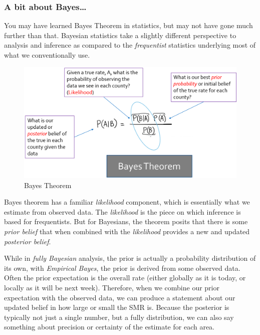 \documentclass[
]{book}
\begin{document}
\hypertarget{a-bit-about-bayes}{%
\subsubsection{A bit about Bayes\ldots{}}\label{a-bit-about-bayes}}

You may have learned Bayes Theorem in statistics, but may not have gone much further than that. Bayesian statistics take a slightly different perspective to analysis and inference as compared to the \emph{frequentist} statistics underlying most of what we conventionally use.

\begin{figure}
\centering
\includegraphics{images/bayes.png}
\caption{\label{fig:unnamed-chunk-21}Bayes Theorem}
\end{figure}

Bayes theorem has a familiar \emph{likelihood} component, which is essentially what we estimate from observed data. The \emph{likelihood} is the piece on which inference is based for frequentists. But for Bayesians, the theorem posits that there is some \emph{prior belief} that when combined with the \emph{likelihood} provides a new and updated \emph{posterior belief}.

While in \emph{fully Bayesian} analysis, the prior is actually a probability distribution of its own, with \emph{Empirical Bayes}, the prior is derived from some observed data. Often the prior expectation is the overall rate (either globally as it is today, or locally as it will be next week). Therefore, when we combine our prior expectation with the observed data, we can produce a statement about our updated belief in how large or small the SMR is. Because the posterior is typically not just a single number, but a fully distribution, we can also say something about precision or certainty of the estimate for each area.
\end{document}
